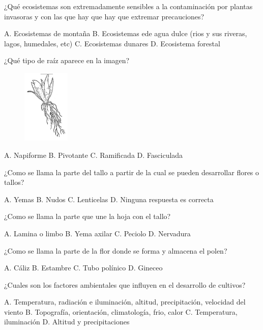\documentclass[11pt,answers]{exam}
\begin{document}
{\begin{questions}
\question ¿Qué ecosistemas son extremadamente sensibles a la contaminación por
  plantas invasoras y con las que hay que hay que extremar precauciones?
  \begin{checkboxes}
    \choice A. Ecosistemas de montaña
    \CorrectChoice B. Ecosistemas ede agua dulce (rios y sus
    riveras, lagos, humedales, etc)
    \choice C. Ecosistemas dunares
    \choice D. Ecosistema forestal
  \end{checkboxes}
\newpage
\question ¿Qué tipo de raíz aparece en la imagen?
  \begin{figure}[h!]
    \centering
    \includegraphics[width=0.2\textwidth]{fasciculada.PNG}
  \end{figure}
  \begin{checkboxes}
    \choice A. Napiforme
    \choice B. Pivotante
    \choice C. Ramificada
    \CorrectChoice D. Fasciculada
  \end{checkboxes}

\question ¿Como se llama la parte del tallo a partir de la cual se pueden
  desarrollar flores o tallos?
  \begin{checkboxes}
    \CorrectChoice A. Yemas
    \choice B. Nudos
    \choice C. Lenticelas
    \choice D. Ninguna respuesta es correcta
  \end{checkboxes}

\question ¿Como se llama la parte que une la hoja con el tallo?
  \begin{checkboxes}
    \choice A. Lamina o limbo
    \choice B. Yema axilar
    \CorrectChoice C. Peciolo
    \choice D. Nervadura
  \end{checkboxes}

\question ¿Como se llama la parte de la flor donde se forma y almacena el polen?
  \begin{checkboxes}
    \choice A. Cáliz
    \CorrectChoice B. Estambre
    \choice C. Tubo polínico
    \choice D. Gineceo
  \end{checkboxes}

\question ¿Cuales son los factores ambientales que influyen en el desarrollo de
  cultivos?
  \begin{checkboxes}
    \CorrectChoice A. Temperatura, radiación e iluminación, altitud, precipitación,
    velocidad del viento
    \choice B. Topografía, orientación, climatología, frio, calor
    \choice C. Temperatura, iluminación
    \choice D. Altitud y precipitaciones
  \end{checkboxes}
\end{questions}

}
\end{document}
